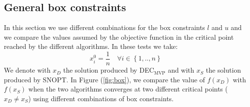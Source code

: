 \subsection{General box constraints}
In this section we use different combinations for the box constraints $l$ and $u$ and we compare the values assumed by the objective function in the critical point reached by the different algorithms. In these tests we take:
\begin{equation}\label{eq:startxx}
x_i^0 = \frac{1}{n} \quad \forall i \in \left\{1, .., n \right\}
\end{equation}
We denote with $x_{D}$ the solution produced by DEC$_{\text{MVP}}$ and with $x_{S}$ the solution produced by SNOPT. In Figure (\ref{fig:box}), we compare the value of $f(x_{D})$ with $f(x_{S})$ when the two algorithms converges at two different critical points ($x_D \neq x_S$) using different combinations of box constraints.


